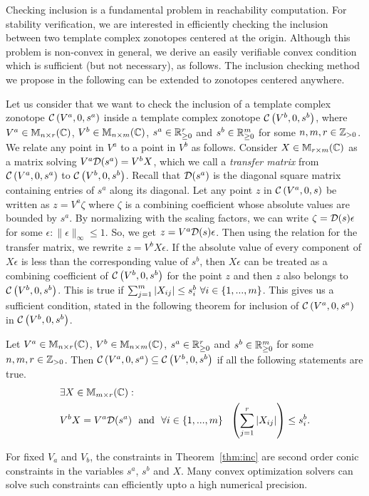 Checking inclusion is a fundamental problem in reachability
computation. For stability verification, we are interested in
efficiently checking the inclusion between two template complex
zonotopes centered at the origin.  Although this problem is non-convex
in general, we derive an easily verifiable convex condition which is
sufficient (but not necessary), as follows.  The inclusion checking
method we propose in the following can be extended to zonotopes
centered anywhere.


Let us consider that we want to check the inclusion of a template
complex zonotope $\mathcal{C}\left(V^a,0,s^a\right)$ inside a template complex zonotope
$\mathcal{C}\left(V^b,0,s^b\right)$, where $V^a\in\mathbb{M}_{n\times r}(\mathbb{C})$, $V^b\in\mathbb{M}_{n\times m}(\mathbb{C})$,
$s^a\in\mathbb{R}^{r}_{\geq 0}$ and $s^b\in\mathbb{R}^m_{\geq 0}$ for some
$n,m,r\in\mathbb{Z}_{> 0}$.  We relate any point in $V^a$ to a point in $V^b$ as
follows.  Consider $X\in\mathbb{M}_{r\times m}(\mathbb{C})$ as a matrix solving
$V^a\mathcal{D}(s^a)=V^bX$, which we call a \emph{transfer matrix} from
$\mathcal{C}\left(V^a,0,s^a\right)$ to $\mathcal{C}\left(V^b,0,s^b\right)$.  Recall that $\mathcal{D}(s^a)$ is the
diagonal square matrix containing entries of $s^a$ along its
diagonal. Let any point $z$ in $\mathcal{C}\left(V^a,0,s\right)$ be written as
$z=V^a\zeta$ where $\zeta$ is a combining coefficient whose absolute
values are bounded by $s^a$.  By normalizing with the scaling factors,
we can write $\zeta=\mathcal{D}(s)\epsilon$ for some
$\epsilon:\|\epsilon\|_{\infty}\leq 1$.  So, we get
$z=V^a\mathcal{D}(s)\epsilon$.  Then using the relation for the transfer
matrix, we rewrite $z=V^bX\epsilon$.  If the absolute value of every
component of $X\epsilon$ is less than the corresponding value of
$s^b$, then $X\epsilon$ can be treated as a combining coefficient of
$\mathcal{C}\left(V^b,0,s^b\right)$ for the point $z$ and then $z$ also belongs to
$\mathcal{C}\left(V^b,0,s^b\right)$.  This is true if $\sum_{j=1}^m|X_{ij}|\leq
s^b_i~\forall i\in\{1,...,m\}$.  This gives us a sufficient condition,
stated in the following theorem for inclusion of $\mathcal{C}\left(V^a,0,s^a\right)$ in
$\mathcal{C}\left(V^b,0,s^b\right)$.

%
\begin{thm}[Inclusion]\label{thm:inc}
   Let $V^a\in\mathbb{M}_{n\times r}(\mathbb{C})$, $V^b\in\mathbb{M}_{n\times m}(\mathbb{C})$, $s^a\in\mathbb{R}^{r}_{\geq
     0}$ and $s^b\in\mathbb{R}^m_{\geq 0}$ for some $n,m,r\in\mathbb{Z}_{> 0}$.  Then
   $\mathcal{C}\left(V^a,0,s^a\right)\subseteq \mathcal{C}\left(V^b,0,s^b\right)$ if all the following
   statements are true.   
\begin{align}
\begin{split}
& \exists X\in\mathbb{M}_{m\times r}(\mathbb{C}):~\\
& V^bX=V^a\mathcal{D}(s^a)~~\text{and}~~\forall i\in\{1,...,m\}~~\left(\sum_{j=1}^r|X_{ij}|\right)\leq s_i^b.
\end{split}
\end{align}
\end{thm}


For fixed $V_a$ and $V_b$, the constraints in Theorem~\ref{thm:inc}
are second order conic constraints in the variables $s^a$, $s^b$ and
$X$.  Many convex optimization solvers can solve such constraints can
efficiently upto a high numerical precision.



